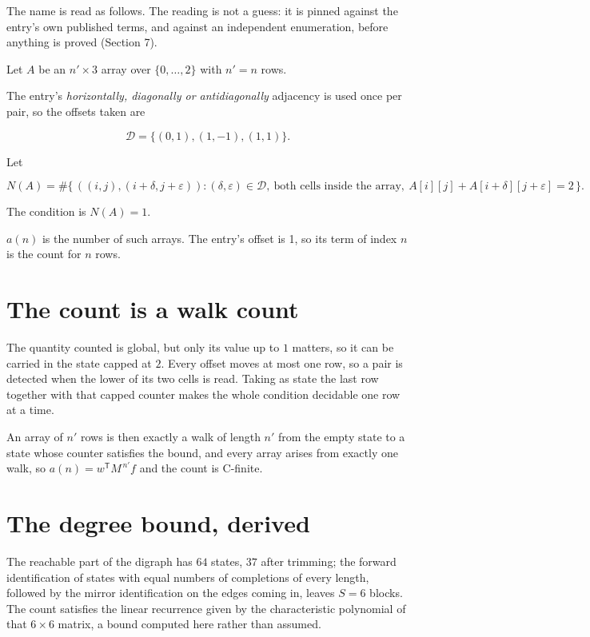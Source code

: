 \documentclass[11pt]{article}
\theoremstyle{definition}
\begin{document}
The name is read as follows. The reading is not a guess: it is pinned against the entry's own published terms, and against an independent enumeration, before anything is proved (Section 7).

Let $A$ be an $n' \times 3$ array over $\{0,\dots,2\}$ with $n' = n$ rows.

The entry's {\itshape horizontally, diagonally or antidiagonally} adjacency is used once per pair, so the offsets taken are

\[\mathcal{D} = \{(0,1), (1,-1), (1,1)\}.\]

Let

\[N(A) = \#\bigl\{\,((i,j),(i{+}\delta,j{+}\varepsilon)) : (\delta,\varepsilon) \in \mathcal{D},\ \text{both cells inside the array},\ A[i][j] + A[i{+}\delta][j{+}\varepsilon] = 2\,\bigr\}.\]

The condition is $N(A) = 1$.

$a(n)$ is the number of such arrays. The entry's offset is 1, so its term of index $n$ is the count for $n$ rows.

\section{The count is a walk count}

The quantity counted is global, but only its value up to $1$ matters, so it can be carried in the state capped at $2$. Every offset moves at most one row, so a pair is detected when the lower of its two cells is read. Taking as state the last row together with that capped counter makes the whole condition decidable one row at a time.

An array of $n'$ rows is then exactly a walk of length $n'$ from the empty state to a state whose counter satisfies the bound, and every array arises from exactly one walk, so $a(n) = w^{\mathsf T}M^{\,n'}f$ and the count is C-finite.

\section{The degree bound, derived}

The reachable part of the digraph has $64$ states, $37$ after trimming; the forward identification of states with equal numbers of completions of every length, followed by the mirror identification on the edges coming in, leaves $S = 6$ blocks. The count satisfies the linear recurrence given by the characteristic polynomial of that $6\times6$ matrix, a bound computed here rather than assumed.
\end{document}

